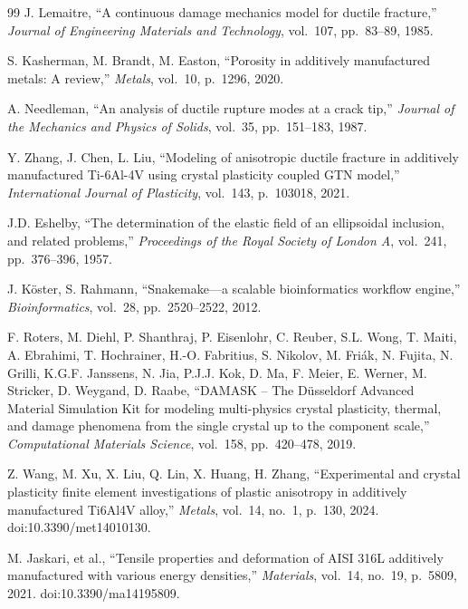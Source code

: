 \documentclass[12pt,a4paper,twocolumn]{article}
\begin{document}
\begin{thebibliography}{99}
J. Lemaitre, ``A continuous damage mechanics model for ductile fracture,'' \textit{Journal of Engineering Materials and Technology}, vol.~107, pp.~83--89, 1985.

S. Kasherman, M. Brandt, M. Easton, ``Porosity in additively manufactured metals: A review,'' \textit{Metals}, vol.~10, p.~1296, 2020.

A. Needleman, ``An analysis of ductile rupture modes at a crack tip,'' \textit{Journal of the Mechanics and Physics of Solids}, vol.~35, pp.~151--183, 1987.

Y. Zhang, J. Chen, L. Liu, ``Modeling of anisotropic ductile fracture in additively manufactured Ti-6Al-4V using crystal plasticity coupled GTN model,'' \textit{International Journal of Plasticity}, vol.~143, p.~103018, 2021.

J.D. Eshelby, ``The determination of the elastic field of an ellipsoidal inclusion, and related problems,'' \textit{Proceedings of the Royal Society of London A}, vol.~241, pp.~376--396, 1957.

J. K\"{o}ster, S. Rahmann, ``Snakemake---a scalable bioinformatics workflow engine,'' \textit{Bioinformatics}, vol.~28, pp.~2520--2522, 2012.

F. Roters, M. Diehl, P. Shanthraj, P. Eisenlohr, C. Reuber, S.L. Wong, T. Maiti, A. Ebrahimi, T. Hochrainer, H.-O. Fabritius, S. Nikolov, M. Fri\'{a}k, N. Fujita, N. Grilli, K.G.F. Janssens, N. Jia, P.J.J. Kok, D. Ma, F. Meier, E. Werner, M. Stricker, D. Weygand, D. Raabe, ``DAMASK -- The D\"{u}sseldorf Advanced Material Simulation Kit for modeling multi-physics crystal plasticity, thermal, and damage phenomena from the single crystal up to the component scale,'' \textit{Computational Materials Science}, vol.~158, pp.~420--478, 2019.

Z. Wang, M. Xu, X. Liu, Q. Lin, X. Huang, H. Zhang, ``Experimental and crystal plasticity finite element investigations of plastic anisotropy in additively manufactured Ti6Al4V alloy,'' \textit{Metals}, vol.~14, no.~1, p.~130, 2024. doi:10.3390/met14010130.

M. Jaskari, et al., ``Tensile properties and deformation of AISI 316L additively manufactured with various energy densities,'' \textit{Materials}, vol.~14, no.~19, p.~5809, 2021. doi:10.3390/ma14195809.


\end{thebibliography}
\end{document}
